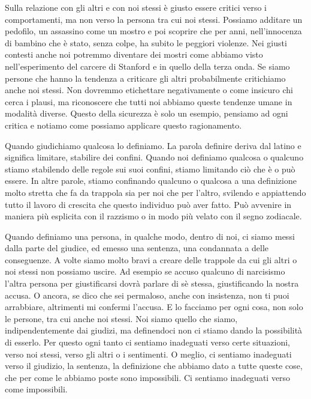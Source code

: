 \documentclass[12pt]{book} %
\begin{document}
Sulla relazione con gli altri e con noi stessi è giusto essere critici verso i comportamenti, ma non verso la persona tra cui noi stessi. 
Possiamo additare un pedofilo, un assassino
come un mostro e poi scoprire che per anni, nell'innocenza di bambino che è stato, senza colpe, ha
subito le peggiori violenze. Nei giusti contesti anche noi potremmo diventare dei mostri come abbiamo visto
nell'esperimento del carcere di Stanford e in quello della terza onda.
Se siamo persone che hanno la tendenza a criticare gli altri
probabilmente critichiamo anche noi stessi. Non dovremmo etichettare negativamente o come insicuro chi cerca i
plausi, ma riconoscere che tutti noi abbiamo queste tendenze umane in modalità diverse. Questo della sicurezza è solo
un esempio, pensiamo ad ogni critica e notiamo come possiamo applicare questo ragionamento.

Quando giudichiamo qualcosa lo definiamo. La parola definire deriva dal latino e significa limitare, stabilire dei
confini. Quando noi definiamo qualcosa o qualcuno stiamo stabilendo delle regole sui suoi confini, stiamo limitando ciò
che è o può essere. In altre parole, stiamo confinando qualcuno o qualcosa a una definizione molto stretta che fa da
trappola sia per noi che per l'altro, svilendo e appiattendo tutto il lavoro di crescita che questo individuo può aver fatto.
Può avvenire in maniera più esplicita con il razzismo o in modo più velato con il segno zodiacale.

Quando definiamo una persona, in qualche modo, dentro di noi, ci siamo messi dalla parte del giudice, ed emesso
una sentenza, una condannata a delle conseguenze. 
A volte siamo molto bravi a creare delle trappole da cui gli altri o noi stessi non possiamo uscire.
Ad esempio se accuso qualcuno di narcisismo l'altra persona per giustificarsi dovrà parlare di sè stessa, giustificando la nostra accusa. O ancora, se dico che sei permaloso, anche con insistenza, non ti puoi arrabbiare, altrimenti mi confermi l'accusa.
E lo facciamo per ogni cosa, non solo le persone, tra cui anche noi stessi. Noi siamo quello che siamo,
indipendentemente dai giudizi, ma definendoci non ci stiamo dando la possibilità di esserlo. Per questo ogni tanto ci
sentiamo inadeguati verso certe situazioni, verso noi stessi, verso gli altri o i sentimenti. O meglio, ci sentiamo
inadeguati verso il giudizio, la sentenza, la definizione che abbiamo dato a tutte queste cose, che per come le abbiamo
poste sono impossibili. Ci sentiamo inadeguati verso come impossibili.
\end{document}
